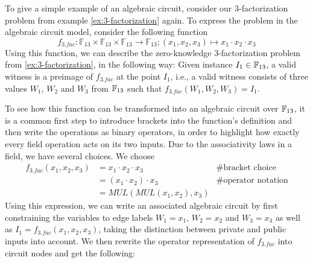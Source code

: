 \begin{example} To give a simple example of an algebraic circuit, consider our $3$-factorization problem from example \ref{ex:3-factorization} again.  To express the problem in the algebraic circuit model, consider the following function 
\[
f_{3.fac}:\mathbb{F}_{13}\times\mathbb{F}_{13}\times\mathbb{F}_{13}\to\mathbb{F}_{13};(x_{1},x_{2},x_{3})\mapsto x_{1}\cdot x_{2}\cdot x_{3}
\]
Using this function, we can describe the zero-knowledge $3$-factorization problem from \ref{ex:3-factorization}, in the following way: Given instance $I_1\in \mathbb{F}_{13}$, a valid witness is a preimage of $f_{3.fac}$ at the point $I_1$, i.e., a valid witness consists of three values $W_1$, $W_2$ and $W_3$ from $\mathbb{F}_{13}$ such that $f_{3.fac}(W_1,W_2,W_3)=I_1$. 

To see how this function can be transformed into an algebraic circuit over $\mathbb{F}_{13}$, it is a common first step to introduce brackets into the function's definition and then write the operations as binary operators, in order to highlight how exactly every field operation acts on its two inputs. Due to the associativity laws in a field, we have several choices. We choose
\begin{align*}
f_{3.fac}(x_1,x_2,x_3) & = x_1\cdot x_2 \cdot x_3  & \text{\# bracket choice} \\
                       & = (x_1\cdot x_2 ) \cdot x_3  & \text{\# operator notation} \\
                       & = MUL(MUL(x_1,x_2),x_3)
\end{align*}
Using this expression, we can write an associated algebraic circuit by first constraining the variables to edge labels $W_1=x_1$, $W_2=x_2$ and $W_3=x_3$ as well as $I_1=f_{3.fac}(x_1,x_2,x_3)$, taking the distinction between private and public inputs into account. We then rewrite the operator representation of $f_{3.fac}$ into circuit nodes and get the following: 
\begin{center}
\end{center}



\end{example}
